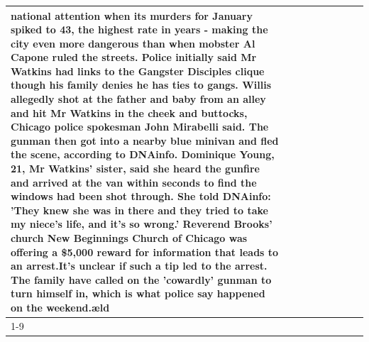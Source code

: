 \begin{table}[H]
\begin{tabular}{lllrlllll}
national attention when its murders for January spiked to 43, the highest rate in years - making the city even more dangerous than when mobster Al Capone ruled the streets. Police initially said Mr Watkins had links to the Gangster Disciples clique though his family denies he has ties to gangs. Willis allegedly shot at the father and baby from an alley and hit Mr Watkins in the cheek and buttocks, Chicago police spokesman John Mirabelli said. The gunman then got into a nearby blue minivan and fled the scene, according to DNAinfo. Dominique Young, 21, Mr Watkins' sister, said she heard the gunfire and arrived at the van within seconds to find the windows had been shot through. She told DNAinfo: 'They knew she was in there and they tried to take my niece's life, and it's so wrong.' Reverend Brooks' church New Beginnings Church of Chicago was offering a \$5,000 reward for information that leads to an arrest.It's unclear if such a tip led to the arrest. The family have called on the 'cowardly' gunman to turn himself in, which is what police say happened on the weekend.æld \\
\cline{1-9}

\end{tabular}
\end{table}

